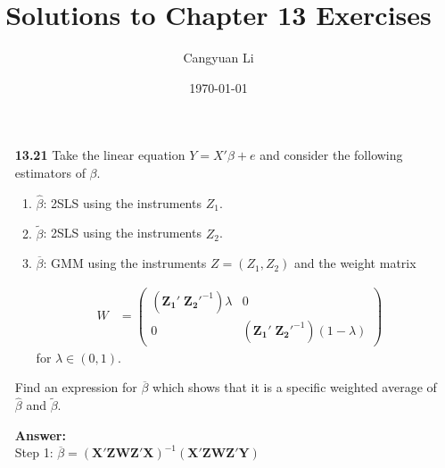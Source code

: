 \documentclass[14pt]{extreport}
\title{Solutions to Chapter 13 Exercises}
\author{Cangyuan Li}
\date{\today}
\newcommand{\answer}[0]{\medskip \textbf{Answer:} \medskip \\}
\begin{document}
    
\maketitle

\begin{enumerate}
    \item [\textbf{13.21}] Take the linear equation \( Y = X'\beta + e \) and consider the following estimators of \( \beta \).
    
        \begin{enumerate}
            \item \( \widehat{\beta} \): 2SLS using the instruments \( Z_1 \).
            \item \( \widetilde{\beta} \): 2SLS using the instruments \( Z_2 \).
            \item \( \overline{\beta} \): GMM using the instruments \( Z = (Z_1, Z_2)\) and the weight matrix
            
            \begin{align*}
                W &= \begin{pmatrix}
                    \left( \mathbf{Z_1' \; Z_2'}^{-1}  \right)\lambda & 0 \\
                    0 & \left( \mathbf{Z_1' \; Z_2'}^{-1}  \right) \left( 1 - \lambda \right)
                \end{pmatrix}
            \end{align*}
            for \( \lambda \in (0, 1) \).
        \end{enumerate}

        Find an expression for \( \overline{\beta} \) which shows that it is a specific weighted average of \( \widehat{\beta} \) and \( \widetilde{\beta} \).

    \answer

    Step 1: $\overline{\beta} = \mathbf{(X'ZWZ'X)}^{-1}\mathbf{(X'ZWZ'Y)}$


\end{enumerate}
\end{document}
